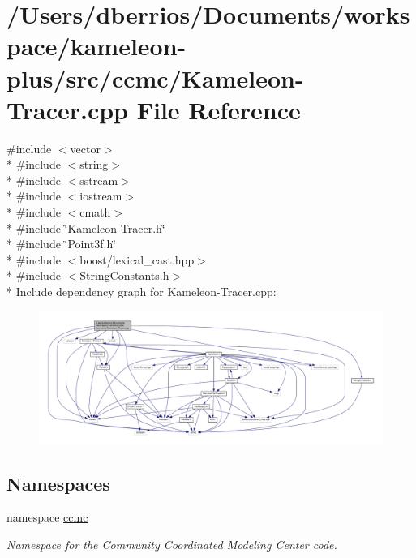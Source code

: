 \hypertarget{_kameleon-_tracer_8cpp}{\section{/\-Users/dberrios/\-Documents/workspace/kameleon-\/plus/src/ccmc/\-Kameleon-\/\-Tracer.cpp File Reference}
\label{_kameleon-_tracer_8cpp}
}
{\ttfamily \#include $<$vector$>$}\\*
{\ttfamily \#include $<$string$>$}\\*
{\ttfamily \#include $<$sstream$>$}\\*
{\ttfamily \#include $<$iostream$>$}\\*
{\ttfamily \#include $<$cmath$>$}\\*
{\ttfamily \#include \char`\"{}Kameleon-\/\-Tracer.\-h\char`\"{}}\\*
{\ttfamily \#include \char`\"{}Point3f.\-h\char`\"{}}\\*
{\ttfamily \#include $<$boost/lexical\-\_\-cast.\-hpp$>$}\\*
{\ttfamily \#include $<$String\-Constants.\-h$>$}\\*
Include dependency graph for Kameleon-\/\-Tracer.cpp\-:
\nopagebreak
\begin{figure}[H]
\begin{center}
\leavevmode
\includegraphics[width=350pt]{_kameleon-_tracer_8cpp__incl}
\end{center}
\end{figure}
\subsection*{Namespaces}
\begin{DoxyCompactItemize}
\item 
namespace \hyperlink{namespaceccmc}{ccmc}
\begin{DoxyCompactList}\small\item\em Namespace for the Community Coordinated Modeling Center code. \end{DoxyCompactList}\end{DoxyCompactItemize}
